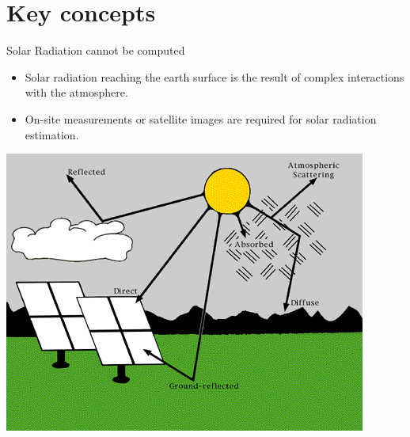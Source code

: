 \documentclass[xcolor={usenames,svgnames,dvipsnames}]{beamer}
\begin{document}
\section{Key concepts}
\label{sec:org2115a3d}
\begin{frame}[label={sec:org30e2aaa}]{Solar Radiation cannot be computed}
\begin{itemize}
\item Solar radiation reaching the earth surface is the result of \alert{complex interactions with the atmosphere}.
\item On-site measurements or satellite images are required for solar radiation estimation.
\end{itemize}
\begin{center}
\includegraphics[height=0.5\textheight]{../figs/SolarRadiationComponents_NREL.png}
\end{center}
\end{frame}
\end{document}
